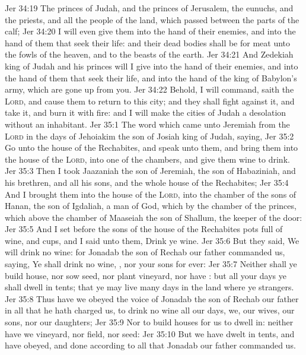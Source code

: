 \vs Jer 34:19 The princes of Judah, and the princes of Jerusalem, the eunuchs, and the priests, and all the people of the land, which passed between the parts of the calf;
\vs Jer 34:20 I will even give them into the hand of their enemies, and into the hand of them that seek their life: and their dead bodies shall be for meat unto the fowls of the heaven, and to the beasts of the earth.
\vs Jer 34:21 And Zedekiah king of Judah and his princes will I give into the hand of their enemies, and into the hand of them that seek their life, and into the hand of the king of Babylon's army, which are gone up from you.
\vs Jer 34:22 Behold, I will command, saith the \textsc{Lord}, and cause them to return to this city; and they shall fight against it, and take it, and burn it with fire: and I will make the cities of Judah a desolation without an inhabitant.
\vs Jer 35:1 The word which came unto Jeremiah from the \textsc{Lord} in the days of Jehoiakim the son of Josiah king of Judah, saying,
\vs Jer 35:2 Go unto the house of the Rechabites, and speak unto them, and bring them into the house of the \textsc{Lord}, into one of the chambers, and give them wine to drink.
\vs Jer 35:3 Then I took Jaazaniah the son of Jeremiah, the son of Habaziniah, and his brethren, and all his sons, and the whole house of the Rechabites;
\vs Jer 35:4 And I brought them into the house of the \textsc{Lord}, into the chamber of the sons of Hanan, the son of Igdaliah, a man of God, which  by the chamber of the princes, which  above the chamber of Maaseiah the son of Shallum, the keeper of the door:
\vs Jer 35:5 And I set before the sons of the house of the Rechabites pots full of wine, and cups, and I said unto them, Drink ye wine.
\vs Jer 35:6 But they said, We will drink no wine: for Jonadab the son of Rechab our father commanded us, saying, Ye shall drink no wine, , nor your sons for ever:
\vs Jer 35:7 Neither shall ye build house, nor sow seed, nor plant vineyard, nor have : but all your days ye shall dwell in tents; that ye may live many days in the land where ye  strangers.
\vs Jer 35:8 Thus have we obeyed the voice of Jonadab the son of Rechab our father in all that he hath charged us, to drink no wine all our days, we, our wives, our sons, nor our daughters;
\vs Jer 35:9 Nor to build houses for us to dwell in: neither have we vineyard, nor field, nor seed:
\vs Jer 35:10 But we have dwelt in tents, and have obeyed, and done according to all that Jonadab our father commanded us.
